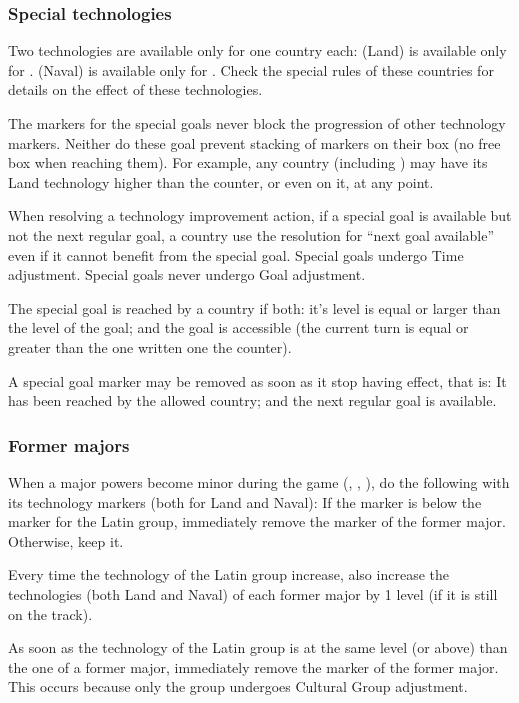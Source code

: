 \subsubsection{Special technologies}
\aparag Two technologies are available only for one country each:
\bparag \TTER (Land) is available only for \HIS.
\bparag \TVGA (Naval) is available only for \VEN.
\bparag Check the special rules of these countries for details on the effect
of these technologies.

\aparag The markers for the special goals never block the progression of other
technology markers.
\bparag Neither do these goal prevent stacking of markers on their box (no
free box when reaching them).
\bparag For example, any country (including \HIS) may have its Land technology
higher than the \TTER counter, or even on it, at any point.

\aparag When resolving a technology improvement action, if a special goal is
available but not the next regular goal, a country use the resolution for
``next goal available'' even if it cannot benefit from the special goal.
\bparag Special goals undergo Time adjustment.
\bparag Special goals never undergo Goal adjustment.

\aparag The special goal is reached by a country if both:
\bparag it's level is equal or larger than the level of the goal;
\bparag and the goal is accessible (the current turn is equal or greater than
the one written one the counter).

\aparag A special goal marker may be removed as soon as it stop having effect,
that is:
\bparag It has been reached by the allowed country;
\bparag and the next regular goal is available.


\subsubsection{Former majors}
\aparag When a major powers become minor during the game (\POR, \VEN, \POL),
do the following with its technology markers (both for Land and Naval):
\bparag If the marker is below the marker for the Latin group, immediately
remove the marker of the former major.
\bparag Otherwise, keep it.

\aparag Every time the technology of the Latin group increase, also increase
the technologies (both Land and Naval) of each former major by 1 level (if it
is still on the track).

\aparag As soon as the technology of the Latin group is at the same level (or
above) than the one of a former major, immediately remove the marker of the
former major. This occurs because only the group undergoes Cultural Group
adjustment.

